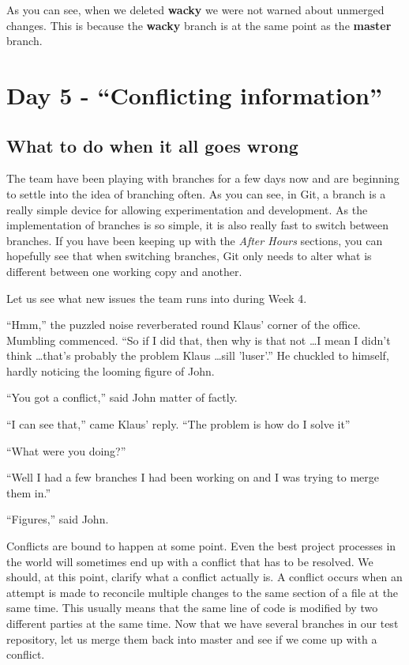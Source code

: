 As you can see, when we deleted \textbf{wacky} we were not warned about unmerged changes.
This is because the \textbf{wacky} branch is at the same point as the \textbf{master} branch.

\section{Day 5 - ``Conflicting information''}
\subsection{What to do when it all goes wrong}
The team have been playing with branches for a few days now and are beginning to settle into the idea of branching often.
As you can see, in Git, a branch is a really simple device for allowing experimentation and development.
As the implementation of branches is so simple, it is also really fast to switch between branches.
If you have been keeping up with the \emph{After Hours} sections, you can hopefully see that when switching branches, Git only needs to alter what is different between one working copy and another.

Let us see what new issues the team runs into during Week 4.

\begin{trenches}
``Hmm,'' the puzzled noise reverberated round Klaus' corner of the office.
Mumbling commenced.
``So if I did that, then why is that not \ldots I mean I didn't think \ldots that's probably the problem Klaus \ldots sill 'luser'.''
He chuckled to himself, hardly noticing the looming figure of John.

``You got a conflict,'' said John matter of factly.

``I can see that,'' came Klaus' reply.
``The problem is how do I solve it''

``What were you doing?''

``Well I had a few branches I had been working on and I was trying to merge them in.''

``Figures,'' said John.
\end{trenches}

Conflicts are bound to happen at some point.
Even the best project processes in the world will sometimes end up with a conflict that has to be resolved.
We should, at this point, clarify what a conflict actually is.
A conflict occurs when an attempt is made to reconcile multiple changes to the same section of a file at the same time.
This usually means that the same line of code is modified by two different parties at the same time.
Now that we have several branches in our test repository, let us merge them back into master and see if we come up with a conflict.

